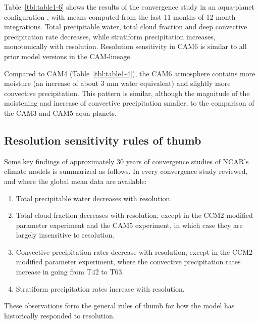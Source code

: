 Table~\ref{tbl:table1-6} shows the results of the convergence study in an aqua-planet configuration \citep[`QOBS' SST profile in][]{NH2000ASL}, with means computed from the last 11 months of 12 month integrations. Total precipitable water, total cloud fraction and deep convective precipitation rate decreases, while stratiform precipitation increases, monotonically with resolution. Resolution sensitivity in CAM6 is similar to all prior model versions in the CAM-lineage. 

Compared to CAM4 (Table~\ref{tbl:table1-4}), the CAM6 atmosphere contains more moisture (an increase of about 3 mm water equivalent) and slightly more convective precipitation. This pattern is similar, although the magnitude of the moistening and increase of convective precipitation smaller, to the comparison of the CAM3 and CAM5 aqua-planets.

\subsection{Resolution sensitivity rules of thumb}

Some key findings of approximately 30 years of convergence studies of NCAR's climate models is summarized as follows. In every convergence study reviewed, and where the global mean data are available:

\begin{enumerate}
\item Total precipitable water decreases with resolution.
\item Total cloud fraction decreases with resolution, except in the CCM2 modified parameter experiment and the CAM5 experiment, in which case they are largely insensitive to resolution.
\item Convective precipitation rates decrease with resolution, except in the CCM2 modified parameter experiment, where the convective precipitation rates increase in going from T42 to T63.
\item Stratiform precipitation rates increase with resolution.
\end{enumerate}

\noindent These observations form the general rules of thumb for how the model has historically responded to resolution.
